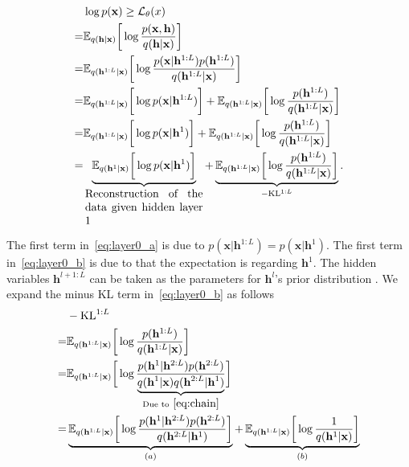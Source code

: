 \documentclass[conference]{IEEEtran}
\begin{document}
\begin{align}  \label{eq:tree_elbo}
&\log p(\mathbf{x})  \geq  \mathcal{L}_{\theta}(x) \\  \notag
=&  \mathbb{E}_{q(\mathbf{h} | \mathbf{x})} \bigg[ \log  \frac{p(\mathbf{x}, \mathbf{h})}{q(\mathbf{h}|\mathbf{x})}  \bigg]  \\  \notag
=&  \mathbb{E}_{q(\mathbf{h}^{1:L} | \mathbf{x})} \bigg[ \log  \frac{p(\mathbf{x} | \mathbf{h}^{1:L}) p( \mathbf{h}^{1:L})}{q(\mathbf{h}^{1:L}|\mathbf{x})}  \bigg]  \\   \notag
 =&  \mathbb{E}_{q(\mathbf{h}^{1:L} | \mathbf{x})} \bigg[  \log p(\mathbf{x} | \mathbf{h}^{1:L})  \bigg]  +  \mathbb{E}_{q(\mathbf{h}^{1:L} | \mathbf{x})} \bigg[ \log   \frac{p( \mathbf{h}^{1:L})}{q(\mathbf{h}^{1:L}|\mathbf{x})}  \bigg]   \\    \label{eq:layer0_a}
=&  \mathbb{E}_{q(\mathbf{h}^{1:L} | \mathbf{x})} \bigg[ \log p(\mathbf{x} | \mathbf{h}^{1})  \bigg]  +  \mathbb{E}_{q(\mathbf{h}^{1:L} | \mathbf{x})} \bigg[ \log     \frac{p( \mathbf{h}^{1:L})}{q(\mathbf{h}^{1:L}|\mathbf{x})}  \bigg]  \\ 
=&  \underbrace{ \mathbb{E}_{q(\mathbf{h}^{1} | \mathbf{x})} \bigg[ \log  p(\mathbf{x} | \mathbf{h}^{1})  \bigg] }_{  \parbox{10.5em}{Reconstruction of the data given hidden layer 1}}  +  \underbrace{  \mathbb{E}_{q(\mathbf{h}^{1:L} | \mathbf{x})} \bigg[ \log  \frac{p( \mathbf{h}^{1:L})}{q(\mathbf{h}^{1:L}|\mathbf{x})}  \bigg] }_{-\text{KL}^{1:L}}.     \label{eq:layer0_b}
\end{align}

The first term in~\eqref{eq:layer0_a} is due to $p(\mathbf{x}|\mathbf{h}^{1:L}) =  p(\mathbf{x}|\mathbf{h}^{1})$. The first term in~\eqref{eq:layer0_b} is due to that the expectation is regarding $\mathbf{h}^{1}$. The hidden variables $\mathbf{h}^{l+1:L}$ can be taken as the parameters for $\mathbf{h}^l$'s  prior distribution .  We expand the minus KL term in~\eqref{eq:layer0_b} as follows
\begin{align} \label{eq:kl_1}
&-\text{KL}^{1:L} \\ \notag
=& \mathbb{E}_{q(\mathbf{h}^{1:L} | \mathbf{x})} \bigg[ \log  \frac{p( \mathbf{h}^{1:L})}{q(\mathbf{h}^{1:L}|\mathbf{x})}  \bigg]   \\ \notag
= &   \mathbb{E}_{q(\mathbf{h}^{1:L} | \mathbf{x})} \bigg[ \log  \frac{p( \mathbf{h}^{1}|  \mathbf{h}^{2:L}) p( \mathbf{h}^{2:L})  }{\underbrace{ q(\mathbf{h}^{1}|\mathbf{x}) q(\mathbf{h}^{2:L}|\mathbf{h}^1)}_{\text{Due to}~\eqref{eq:chain}} }  \bigg] \\ \notag
=&  \underbrace{  \mathbb{E}_{q(\mathbf{h}^{1:L} | \mathbf{x})} \bigg[ \log  \frac{p( \mathbf{h}^{1}|  \mathbf{h}^{2:L}) p( \mathbf{h}^{2:L})  }{ q(\mathbf{h}^{2:L}|\mathbf{h}^1)}  \bigg]  }_{(a)} +   \underbrace{\mathbb{E}_{q(\mathbf{h}^{1:L} | \mathbf{x})} \bigg[ \log \frac{1}{q(\mathbf{h}^{1}|\mathbf{x}) } \bigg] }_{(b)}  \notag
\end{align}
\end{document}
